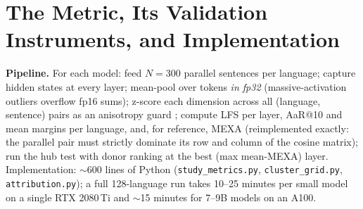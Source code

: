 \documentclass[11pt,a4paper]{article}
\begin{document}
\section{The Metric, Its Validation Instruments, and Implementation}
\textbf{Pipeline.} For each model: feed $N{=}300$ parallel sentences per
language; capture hidden states at every layer; mean-pool over tokens
\emph{in fp32} (massive-activation outliers overflow fp16 sums); z-score each
dimension across all (language, sentence) pairs as an anisotropy guard
\citep{timkey2021rogue}; compute LFS per layer, AaR@10 and mean margins per language, and, for
reference, MEXA (reimplemented exactly: the parallel pair must strictly
dominate its row and column of the cosine matrix); run the hub test with donor ranking at
the best (max mean-MEXA) layer. Implementation: $\sim$600 lines of Python
(\texttt{study\_metrics.py}, \texttt{cluster\_grid.py},
\texttt{attribution.py}); a full 128-language run takes 10--25 minutes per
small model on a single RTX 2080\,Ti and $\sim$15 minutes for 7--9B models on
an A100.
\end{document}
